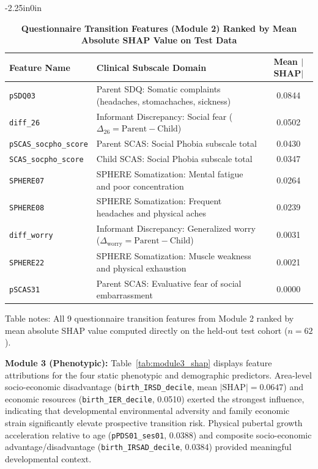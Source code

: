\documentclass[10pt,letterpaper]{article}
\begin{document}
\begin{table}[!t]
\begin{adjustwidth}{-2.25in}{0in}
\centering
\caption{\textbf{Questionnaire Transition Features (Module 2) Ranked by Mean Absolute SHAP Value on Test Data}}
\label{tab:module2_shap}
\footnotesize
\renewcommand{\arraystretch}{1.2}
\begin{tabular}{|l|l|c|}
\hline
\textbf{Feature Name} & \textbf{Clinical Subscale Domain} & \textbf{Mean $|$SHAP$|$} \\
\hline
\texttt{pSDQ03} & Parent SDQ: Somatic complaints (headaches, stomachaches, sickness) & 0.0844 \\
\hline
\texttt{diff\_26} & Informant Discrepancy: Social fear ($\Delta_{26} = \text{Parent} - \text{Child}$) & 0.0502 \\
\hline
\texttt{pSCAS\_socpho\_score} & Parent SCAS: Social Phobia subscale total & 0.0430 \\
\hline
\texttt{SCAS\_socpho\_score} & Child SCAS: Social Phobia subscale total & 0.0347 \\
\hline
\texttt{SPHERE07} & SPHERE Somatization: Mental fatigue and poor concentration & 0.0264 \\
\hline
\texttt{SPHERE08} & SPHERE Somatization: Frequent headaches and physical aches & 0.0239 \\
\hline
\texttt{diff\_worry} & Informant Discrepancy: Generalized worry ($\Delta_{\text{worry}} = \text{Parent} - \text{Child}$) & 0.0031 \\
\hline
\texttt{SPHERE22} & SPHERE Somatization: Muscle weakness and physical exhaustion & 0.0021 \\
\hline
\texttt{pSCAS31} & Parent SCAS: Evaluative fear of social embarrassment & 0.0000 \\
\hline
\end{tabular}
\begin{flushleft}
Table notes: All 9 questionnaire transition features from Module 2 ranked by mean absolute SHAP value computed directly on the held-out test cohort ($n=62$).
\end{flushleft}
\end{adjustwidth}
\end{table}

\textbf{Module 3 (Phenotypic):} Table~\ref{tab:module3_shap} displays feature attributions for the four static phenotypic and demographic predictors. Area-level socio-economic disadvantage (\texttt{birth\_IRSD\_decile}, mean $|\mathrm{SHAP}| = 0.0647$) and economic resources (\texttt{birth\_IER\_decile}, 0.0510) exerted the strongest influence, indicating that developmental environmental adversity and family economic strain significantly elevate prospective transition risk. Physical pubertal growth acceleration relative to age (\texttt{pPDS01\_ses01}, 0.0388) and composite socio-economic advantage/disadvantage (\texttt{birth\_IRSAD\_decile}, 0.0384) provided meaningful developmental context.
\end{document}
